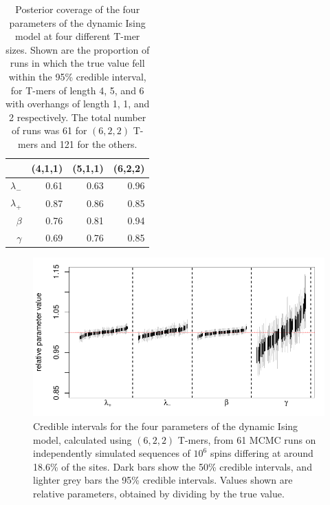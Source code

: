 \documentclass{article}
\theoremstyle{plain}
\theoremstyle{definition}
\begin{document}
\begin{table}[ht]
\centering
\begin{tabular}{rrrr}
  \hline
    & (4,1,1) & (5,1,1) & (6,2,2) \\
  \hline
  $\lambda_-$ & 0.61 & 0.63 & 0.96 \\
  $\lambda_+$ & 0.87 & 0.86 & 0.85 \\
  $\beta$     & 0.76 & 0.81 & 0.94 \\
  $\gamma$    & 0.69 & 0.76 & 0.85 \\
   \hline
\end{tabular}
    \caption{
        Posterior coverage of the four parameters of the dynamic Ising model at four different T-mer sizes.
        Shown are the proportion of runs in which the true value fell within the 95\% credible interval,
        for T-mers of length 4, 5, and 6 with overhangs of length 1, 1, and 2 respectively.
        The total number of runs was 61 for $(6,2,2)$ T-mers and 121 for the others.
        \label{tab:ising_coverage}
    }
\end{table}

\begin{figure}
    \begin{center}
        \includegraphics{writeup-plots/coverage_results}
    \end{center}
    \caption{
        Credible intervals for the four parameters of the dynamic Ising model,
        calculated using $(6,2,2)$ T-mers,
        from 61 MCMC runs on independently simulated sequences of $10^6$ spins
        differing at around 18.6\% of the sites.
        Dark bars show the 50\% credible intervals, and lighter grey bars the 95\% credible intervals.
        Values shown are relative parameters, obtained by dividing by the true value.
        \label{fig:ising_coverage}}
\end{figure}
\end{document}
